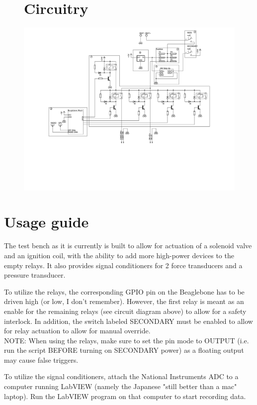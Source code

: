 \documentclass[12pt,article]{memoir}
\begin{document}
\begin{figure} %
	\section{Circuitry}
	\centering
	\includegraphics[width=10in]{EI00002_schematic.pdf} %
\end{figure}

\newpage
\section{Usage guide}
The test bench as it is currently is built to allow for actuation of a solenoid valve and an ignition coil, with the ability to add more high-power devices to the empty relays. It also provides signal conditioners for 2 force transducers and a pressure transducer.

To utilize the relays, the corresponding GPIO pin on the Beaglebone has to be driven high (or low, I don't remember). However, the first relay is meant as an enable for the remaining relays (see circuit diagram above) to allow for a safety interlock. In addition, the switch labeled SECONDARY must be enabled to allow for relay actuation to allow for manual override.\\
NOTE: When using the relays, make sure to set the pin mode to OUTPUT (i.e. run the script BEFORE turning on SECONDARY power) as a floating output may cause false triggers.

To utilize the signal conditioners, attach the National Instruments ADC to a computer running LabVIEW (namely the Japanese "still better than a mac" laptop). Run the LabVIEW program on that computer to start recording data.
\end{document}
